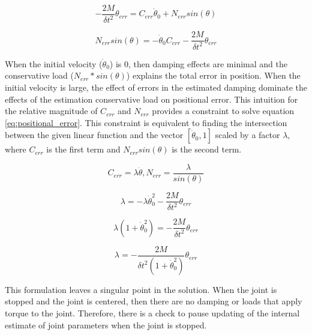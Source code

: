 \begin{equation}
- \dfrac{2M}{\delta t^{2}} \theta_{err} = C_{err} \dot{\theta}_{0} + N_{err} sin \left(\theta \right)
\end{equation}

\begin{equation} \label{eq:positional_error}
N_{err} sin \left(\theta \right) = 
- \dot{\theta}_{0} C_{err}
- \dfrac{2M}{\delta t^{2}} \theta_{err}
\end{equation}

When the initial velocity ($\dot{\theta}_{0}$) is 0, then damping effects are minimal and the conservative load ($N_{err} * sin(\theta)$) explains the total error in position. When the initial velocity is large, the effect of errors in the estimated damping dominate the effects of the estimation conservative load on positional error. This intuition for the relative magnitude of $C_{err}$ and $N_{err}$ provides a constraint to solve equation \ref{eq:positional_error}. This constraint is equivalent to finding the intersection between the given linear function and the vector $[\dot{\theta}_{0}, 1]$ scaled by a factor $\lambda$, where $C_{err}$ is the first term and 
$N_{err} sin(\theta)$ is the second term.

\begin{equation} \label{eq:find_C}
C_{err} = \lambda \dot{\theta}, N_{err} = \dfrac{\lambda}{sin \left(\theta \right)}
\end{equation}

\begin{equation}
\lambda = 
- \lambda \dot{\theta}_{0}^{2}
- \dfrac{2M}{\delta t^{2}} \theta_{err}
\end{equation}

\begin{equation}
\lambda \left(1
+ \dot{\theta}_{0}^{2} \right)
=
- \dfrac{2M}{\delta t^{2}} \theta_{err}
\end{equation}

\begin{equation} \label{eq:lambda_def}
\lambda 
=
- \dfrac{2M}{\delta t^{2} \left(1 + \dot{\theta}_{0}^{2} \right)} \theta_{err}
\end{equation}

This formulation leaves a singular point in the solution. When the joint is stopped and the joint is centered, then there are no damping or loads that apply torque to the joint. Therefore, there is a check to pause updating of the internal estimate of joint parameters when the joint is stopped.

